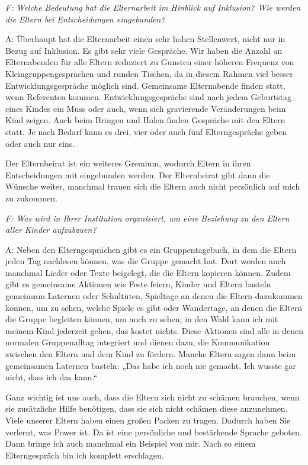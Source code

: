 \emph{F: Welche Bedeutung hat die Elternarbeit im Hinblick auf Inklusion?
Wie werden die Eltern bei Entscheidungen eingebunden?} 

A: Überhaupt hat die Elternarbeit einen sehr hohen Stellenwert, nicht nur in Bezug auf Inklusion. Es gibt sehr viele Gespräche. Wir haben die Anzahl an Elternabenden für alle Eltern reduziert zu Gunsten einer höheren Frequenz von Kleingruppengesprächen und runden Tischen, da in diesem Rahmen viel besser Entwicklungsgespräche möglich sind. Gemeinsame Elternabende finden statt, wenn Referenten kommen.
Entwicklungsgespräche sind nach jedem Geburtstag eines Kindes ein Muss oder auch, wenn sich gravierende Veränderungen beim Kind zeigen. Auch beim Bringen und Holen finden Gespräche mit den Eltern statt. Je nach Bedarf kann es drei, vier oder auch fünf Elterngespräche geben oder auch nur eins.

Der Elternbeirat ist ein weiteres Gremium, wodurch Eltern in ihren Entscheidungen mit eingebunden werden. Der Elternbeirat gibt dann die Wünsche weiter, manchmal trauen sich die Eltern auch nicht persönlich auf mich zu zukommen.


\emph{F: Was wird in Ihrer Institution organisiert, um eine Beziehung zu den Eltern aller Kinder aufzubauen?}

A: Neben den Elterngesprächen gibt es ein Gruppentagebuch, in dem die Eltern jeden Tag nachlesen können, was die Gruppe gemacht hat. Dort werden auch manchmal Lieder oder Texte beigelegt, die die Eltern kopieren können. Zudem gibt es gemeinsame Aktionen wie Feste feiern, Kinder und Eltern basteln gemeinsam Laternen oder Schultüten, Spieltage an denen die Eltern dazukommen können, um zu sehen, welche Spiele es gibt oder Wandertage, an denen die Eltern die Gruppe begleiten können, um auch zu sehen, in den Wald kann ich mit meinem Kind jederzeit gehen, das kostet nichts. Diese Aktionen sind alle in denen normalen Gruppenalltag integriert und dienen dazu, die Kommunikation zwischen den Eltern und dem Kind zu fördern. Manche Eltern sagen dann beim gemeinsamen Laternen basteln: „Das habe ich noch nie gemacht. Ich wusste gar nicht, dass ich das kann.“

Ganz wichtig ist uns auch, dass die Eltern sich nicht zu schämen brauchen, wenn sie zusätzliche Hilfe benötigen, dass sie sich nicht schämen diese anzunehmen. Viele unserer Eltern haben einen großen Packen zu tragen. Dadurch haben Sie verlernt, was Power ist. Da ist eine persönliche und bestärkende Sprache geboten. Dann bringe ich  auch manchmal ein Beispiel von mir. Nach so einem Elterngespräch bin ich komplett erschlagen. 

